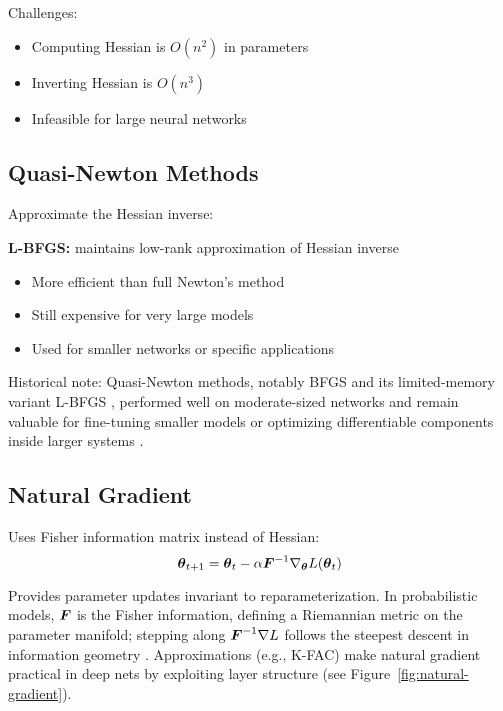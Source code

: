 Challenges:
\begin{itemize}
    \item Computing Hessian is $O(n^2)$ in parameters
    \item Inverting Hessian is $O(n^3)$
    \item Infeasible for large neural networks
\end{itemize}

\subsection{Quasi-Newton Methods}

Approximate the Hessian inverse:

\textbf{L-BFGS:} maintains low-rank approximation of Hessian inverse
\begin{itemize}
    \item More efficient than full Newton's method
    \item Still expensive for very large models
    \item Used for smaller networks or specific applications
\end{itemize}

Historical note: Quasi-Newton methods, notably BFGS and its limited-memory variant L-BFGS \cite{LiuNocedal1989}, performed well on moderate-sized networks and remain valuable for fine-tuning smaller models or optimizing differentiable components inside larger systems \cite{GoodfellowEtAl2016,Bishop2006}.

\subsection{Natural Gradient}

Uses Fisher information matrix instead of Hessian:
\begin{equation}
\boldsymbol{\theta}_{t+1} = \boldsymbol{\theta}_t - \alpha \boldsymbol{F}^{-1} \nabla_{\boldsymbol{\theta}} L(\boldsymbol{\theta}_t)
\end{equation}

Provides parameter updates invariant to reparameterization. In probabilistic models, \(\boldsymbol{F}\) is the Fisher information, defining a Riemannian metric on the parameter manifold; stepping along \(\boldsymbol{F}^{-1}\nabla L\) follows the steepest descent in information geometry \cite{Amari1998}. Approximations (e.g., K-FAC) make natural gradient practical in deep nets by exploiting layer structure (see Figure~\ref{fig:natural-gradient}).

